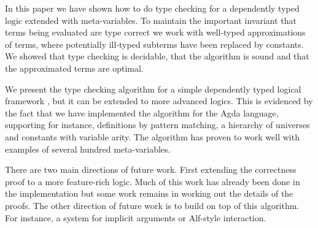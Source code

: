 
In this paper we have shown how to do type checking for a dependently typed
logic extended with meta-variables. To maintain the important invariant that
terms being evaluated are type correct we work with well-typed approximations
of terms, where potentially ill-typed subterms have been replaced by constants.
We showed that type checking is decidable, that the algorithm is sound and that
the approximated terms are optimal.

We present the type checking algorithm for a simple dependently typed logical
framework {\Core}, but it can be extended to more advanced logics.  This is
evidenced by the fact that we have implemented the algorithm for the
Agda language, supporting for instance, definitions by pattern matching, a
hierarchy of universes and constants with variable arity. The algorithm has
proven to work well with examples of several hundred meta-variables.

There are two main directions of future work. First extending the correctness
proof to a more feature-rich logic. Much of this work has already been done
in the implementation but some work remains in working out the details of the
proofs. The other direction of future work is to build on top of this
algorithm. For instance, a system for implicit arguments or Alf-style
interaction\cite{magnussonnordstrom:alf}.

